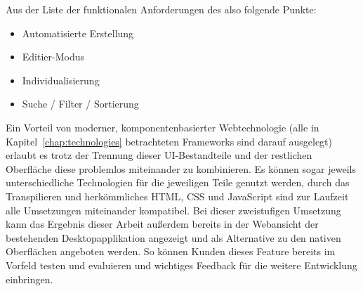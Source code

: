 Aus der Liste der funktionalen Anforderungen des  also folgende Punkte:
\begin{itemize}
    \item{Automatisierte Erstellung}
    \item{Editier-Modus}
    \item{Individualisierung}
    \item{Suche / Filter / Sortierung}
\end{itemize}

Ein Vorteil von moderner, komponentenbasierter Webtechnologie (alle in Kapitel~\ref{chap:technologies} betrachteten Frameworks sind darauf ausgelegt) erlaubt es trotz der Trennung dieser UI-Bestandteile und der restlichen Oberfläche diese problemlos miteinander zu kombinieren. Es können sogar jeweils unterschiedliche Technologien für die jeweiligen Teile genutzt werden, durch das Transpilieren und herkömmliches HTML, CSS und JavaScript sind zur Laufzeit alle Umsetzungen miteinander kompatibel.
Bei dieser zweistufigen Umsetzung kann das Ergebnis dieser Arbeit außerdem bereits in der Webansicht der bestehenden Desktopapplikation angezeigt und als Alternative zu den nativen Oberflächen angeboten werden. So können Kunden dieses Feature bereits im Vorfeld testen und evaluieren und wichtiges Feedback für die weitere Entwicklung einbringen.
